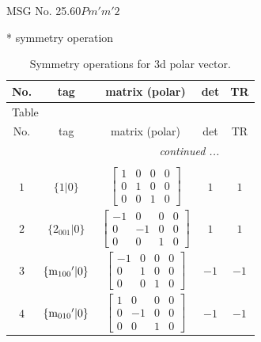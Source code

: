 \documentclass[fleqn,8pt]{jsarticle}
\begin{document}
\setcounter{MaxMatrixCols}{32}

\renewcommand{\tablename}{Table~}
\renewcommand{\figurename}{Figure~}
\begin{center}
\LARGE
MSG No. 25.60\quad$Pm'm'2$
\end{center}
* symmetry operation
\renewcommand{\arraystretch}{1.3}
\begin{longtable}{ccccc}
\caption{Symmetry operations for 3d polar vector.}
 \\
 \hline \hline
No. & tag & matrix (polar) & det & TR \\ \hline \endfirsthead

\multicolumn{4}{l}{\tablename\ \thetable{}} \\
 \hline \hline
No. & tag & matrix (polar) & det & TR \\ \hline \endhead

 \hline \hline
\multicolumn{4}{r}{\footnotesize\it continued ...} \\ \endfoot

 \hline \hline
\multicolumn{4}{r}{} \\ \endlastfoot

$ 1 $ & $ \{1|0\} $ & $ \begin{bmatrix} 1 & 0 & 0 & 0 \\ 0 & 1 & 0 & 0 \\ 0 & 0 & 1 & 0 \end{bmatrix} $ & $ 1 $ & $ 1 $ \\ \hline
$ 2 $ & $ \{2{}_{001}|0\} $ & $ \begin{bmatrix} -1 & 0 & 0 & 0 \\ 0 & -1 & 0 & 0 \\ 0 & 0 & 1 & 0 \end{bmatrix} $ & $ 1 $ & $ 1 $ \\ \hline
$ 3 $ & $ \{{\rm m}_{100}{}'|0\} $ & $ \begin{bmatrix} -1 & 0 & 0 & 0 \\ 0 & 1 & 0 & 0 \\ 0 & 0 & 1 & 0 \end{bmatrix} $ & $ -1 $ & $ -1 $ \\ \hline
$ 4 $ & $ \{{\rm m}_{010}{}'|0\} $ & $ \begin{bmatrix} 1 & 0 & 0 & 0 \\ 0 & -1 & 0 & 0 \\ 0 & 0 & 1 & 0 \end{bmatrix} $ & $ -1 $ & $ -1 $ \\
\end{longtable}
\end{document}
